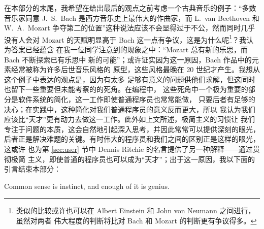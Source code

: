 在本部分的末尾，我希望在给出最后的观点之前考虑一个古典音乐的例子：“多数
音乐家同意 J.\ S.\ Bach 是西方音乐史上最伟大的作曲家，而 L.\ van Beethoven
和 W.\ A.\ Mozart 争夺第二的位置”这种说法应该不会显得过于不公，然而同时几乎
没有人会对 Mozart 的天赋明显高于 Bach 这一点有争议，这是为什么呢\footnote%
{类似的比较或许也可以在 Albert Einstein 和 John von Neumann 之间进行，虽然对两者
伟大程度的判断将比对 Bach 和 Mozart 的判断更有争议得多。}？我认为答案已经蕴含
在我一位同学注意到的现象之中：“Mozart 总有新的乐思，而 Bach 不断探索已有乐思中
新的可能”；或许证实因为这一原因，Bach 作品中的元素经常被称为许多后世音乐风格的
原型，这些风格最晚在 20 世纪才产生。我想从这个例子中表达的观点是，因为有太多
足够有意义的问题供他们求解，但这同时也留下一些重要但未能考察的的死角。在编程中，
这些死角中一个极为重要的部分是软件系统的简化，这一工作即使普通程序员也常常能做，
只要后者有足够的决心；在实践中，这种简化对我们普通程序员的意义反而更大，所以
我认为我们应该比“天才”更有动力去做这一工作。此外如上文所述，极简主义的习惯让
我们专注于问题的本质，这会自然地引起深入思考，并因此常常可以提供深刻的眼光，
后者正是解决难题的关键。有时伟大的程序员和我们之间的区别正是这样的眼光，这或许
也为第 \ref{sec:user} 节中 Dennis Ritchie 的名言提供了另一种解释——通过贯彻极简
主义，即使普通的程序员也可以成为“天才”；出于这一原因，我以下面的引言结束本部分：
\begin{quoting}
	Common sense is instinct, and enough of it is genius.
\end{quoting}

